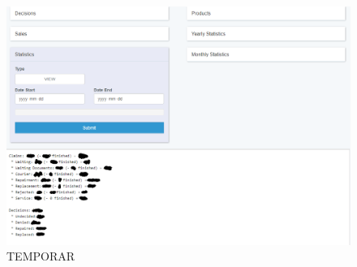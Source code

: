 	\begin{figure}
		\includegraphics[width=\linewidth]{../imagini/statistics.png}
		\caption{TEMPORAR}
		\label{fig:TEMP}
	\end{figure}

